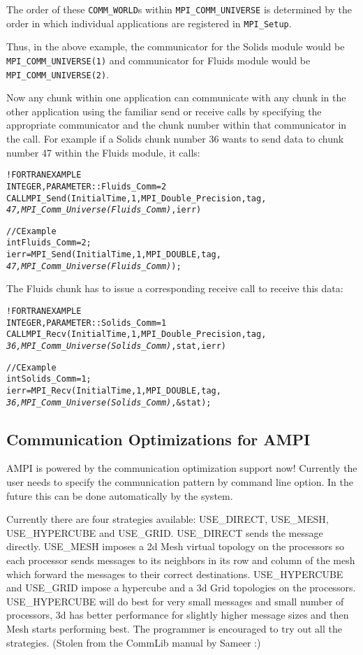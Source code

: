 \documentclass[10pt]{article}
\begin{document}
The order of these \texttt{COMM\_WORLD}s within \texttt{MPI\_COMM\_UNIVERSE}
is determined by the order in which individual applications are registered in
\texttt{MPI\_Setup}.

Thus, in the above example, the communicator for the Solids module would be
\texttt{MPI\_COMM\_UNIVERSE(1)} and communicator for Fluids module would be
\texttt{MPI\_COMM\_UNIVERSE(2)}.

Now any chunk within one application can communicate with any chunk in the
other application using the familiar send or receive \ampi{} calls by
specifying the appropriate communicator and the chunk number within that
communicator in the call. For example if a Solids chunk number 36 wants to send
data to chunk number 47 within the Fluids module, it calls:

\begin{alltt}
!FORTRAN EXAMPLE
INTEGER , PARAMETER :: Fluids_Comm = 2
CALL MPI_Send(InitialTime, 1, MPI_Double_Precision, tag, 
              \emph{47, MPI_Comm_Universe(Fluids_Comm)}, ierr)

//C Example
int Fluids_Comm = 2;
ierr = MPI_Send(InitialTime, 1, MPI_DOUBLE, tag,
                \emph{47, MPI_Comm_Universe(Fluids_Comm)});
\end{alltt}

The Fluids chunk has to issue a corresponding receive call to receive this
data:

\begin{alltt}
!FORTRAN EXAMPLE
INTEGER , PARAMETER :: Solids_Comm = 1
CALL MPI_Recv(InitialTime, 1, MPI_Double_Precision, tag, 
              \emph{36, MPI_Comm_Universe(Solids_Comm)}, stat, ierr)

//C Example
int Solids_Comm = 1;
ierr = MPI_Recv(InitialTime, 1, MPI_DOUBLE, tag,
                \emph{36, MPI_Comm_Universe(Solids_Comm)}, &stat);
\end{alltt}

\subsection{Communication Optimizations for AMPI}
AMPI is powered by the \charmpp{} communication optimization support now!
Currently the user needs to specify the communication pattern by command
line option. In the future this can be done automatically by the system.

Currently there are four strategies available: USE\_DIRECT, USE\_MESH,
USE\_HYPERCUBE and USE\_GRID. USE\_DIRECT sends the message directly. 
USE\_MESH imposes a 2d Mesh virtual topology on the processors so each 
processor sends messages to its neighbors in its row and column of the 
mesh which forward the messages to their correct destinations. USE\_HYPERCUBE 
and USE\_GRID impose a hypercube and a 3d Grid topologies on the processors. 
USE\_HYPERCUBE will do best for very small messages and small number of 
processors, 3d has better performance for slightly higher message sizes 
and then Mesh starts performing best. The programmer is encouraged to try 
out all the strategies. (Stolen from the CommLib manual by Sameer :)
\end{document}
